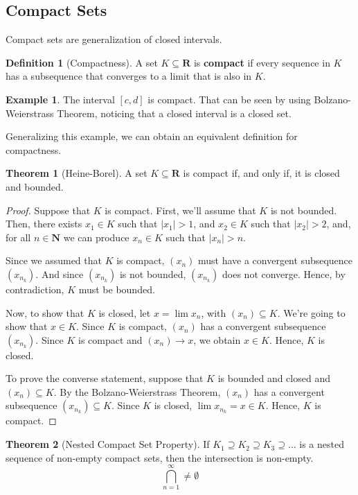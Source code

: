 \documentclass[12pt,a4paper]{article}
\theoremstyle{definition}
\newtheorem{theorem}{Theorem}[section]
\newtheorem{example}{Example}[section]
\newtheorem{definition}{Definition}[section]
\begin{document}
\subsection{Compact Sets}

Compact sets are generalization of closed intervals.

\begin{definition}[Compactness]
	A set $K \subseteq \textbf{R}$ is \textbf{compact} if every sequence in $K$ has a subsequence that converges to a limit that is also in $K$.
\end{definition}

\begin{example}
	The interval $[c,d]$ is compact. That can be seen by using Bolzano-Weierstrass Theorem, noticing that a closed interval is a closed set.
\end{example}

Generalizing this example, we can obtain an equivalent definition for compactness.

\begin{theorem}[Heine-Borel]\label{heine-borel}
	A set $K \subseteq \textbf{R}$ is compact if, and only if, it is closed and bounded.
\end{theorem}

\begin{proof}
	Suppose that $K$ is compact. First, we'll assume that $K$ is not bounded. Then, there exists $x_1 \in K$ such that $|x_1| > 1$, and $x_2 \in K$ such that $|x_2| > 2$, and, for all $n \in \textbf{N}$ we can produce $x_n \in K$ such that $|x_n| > n$.
	
	Since we assumed that $K$ is compact, $(x_n)$ must have a convergent subsequence $(x_{n_k})$. And since $(x_{n_k})$ is not bounded, $(x_{n_k})$ does not converge. Hence, by contradiction, $K$ must be bounded.
	
	Now, to show that $K$ is closed, let $x = \lim x_n$, with $(x_n) \subseteq K$. We're going to show that $x \in K$. Since $K$ is compact, $(x_n)$ has a convergent subsequence $(x_{n_k})$. Since $K$ is compact and $(x_n) \to x$, we obtain $x \in K$. Hence, $K$ is closed.
	
	To prove the converse statement, suppose that $K$ is bounded and closed and $(x_n) \subseteq K$. By the Bolzano-Weierstrass Theorem, $(x_n)$ has a convergent subsequence $(x_{n_k}) \subseteq K$. Since $K$ is closed, $\lim x_{n_k} = x \in K$. Hence, $K$ is compact.
\end{proof}

\begin{theorem}[Nested Compact Set Property]
	If $K_1 \supseteq K_2 \supseteq K_3 \supseteq \ldots$ is a nested sequence of non-empty compact sets, then the intersection is non-empty.
	\[
		\bigcap_{n=1}^\infty \neq \emptyset
	\]
\end{theorem}
\end{document}
